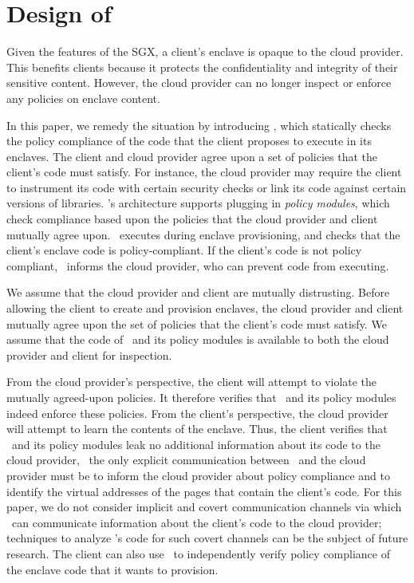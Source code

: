 \section{Design of \TOOL}
\label{section:design}

%
Given the features of the SGX, a client's enclave is opaque to the cloud
provider. This benefits clients because it protects the confidentiality and
integrity of their sensitive content. However, the cloud provider can no longer
inspect or enforce any policies on enclave content.

In this paper, we remedy the situation by introducing \tool, which statically
checks the policy compliance of the code that the client proposes to execute in
its enclaves. The client and cloud provider agree upon a set of policies that
the client's code must satisfy. For instance, the cloud provider may require
the client to instrument its code with certain security checks or link its code
against certain versions of libraries. \tool's architecture supports plugging
in \textit{policy modules}, which check compliance based upon the policies that
the cloud provider and client mutually agree upon. \tool\ executes during
enclave provisioning, and checks that the client's enclave code is
policy-compliant. If the client's code is not policy compliant, \tool\ informs
the cloud provider, who can prevent code from executing.

%
We assume that the cloud provider and client are mutually distrusting. Before
allowing the client to create and provision enclaves, the cloud provider and
client mutually agree upon the set of policies that the client's code must
satisfy. We assume that the code of \tool\ and its policy modules is available
to both the cloud provider and client for inspection. 

From the cloud provider's perspective, the client will attempt to violate the
mutually agreed-upon policies. It therefore verifies that \tool\ and its policy
modules indeed enforce these policies. From the client's perspective, the cloud
provider will attempt to learn the contents of the enclave. Thus, the client
verifies that \tool\ and its policy modules leak no additional information
about its code to the cloud provider, \ie~the only explicit communication
between \tool\ and the cloud provider must be to inform the cloud provider
about policy compliance and to identify the virtual addresses of the pages that
contain the client's code. For this paper, we do not consider implicit and
covert communication channels via which \tool\ can communicate information
about the client's code to the cloud provider; techniques to analyze \tool's
code for such covert channels can be the subject of future research. The client
can also use \tool\ to independently verify policy compliance of the enclave
code that it wants to provision.


